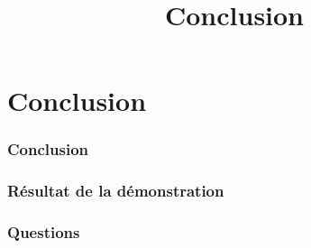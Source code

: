 \section{Conclusion}
 \begin{frame}
 \title{Conclusion}
 \titlepage

 \end{frame}
 
 
 
\begin{frame}
\frametitle{Conclusion}

\end{frame}


 \begin{frame}
 \frametitle{Résultat de la démonstration}

\end{frame}

 \begin{frame}
 \frametitle{Questions}

\end{frame}